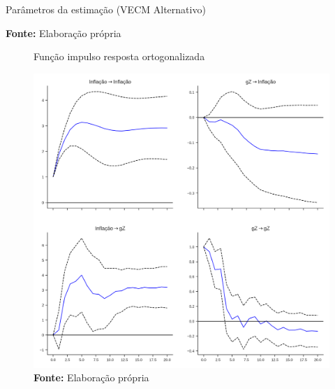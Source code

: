 \begin{table}[H]
	\centering
	\caption{Parâmetros da estimação (VECM Alternativo)}
	
	\caption*{\textbf{Fonte:} Elaboração própria}
\end{table}

\begin{figure}[htb]
	\centering
	\caption{Função impulso resposta ortogonalizada}
	\label{fevd}
	\includegraphics[width=\textwidth]{../../Modelo/SeriesTemporais/figs/Impulso_VECM_Infla.png}
	\caption*{\textbf{Fonte:} Elaboração própria}
\end{figure}


